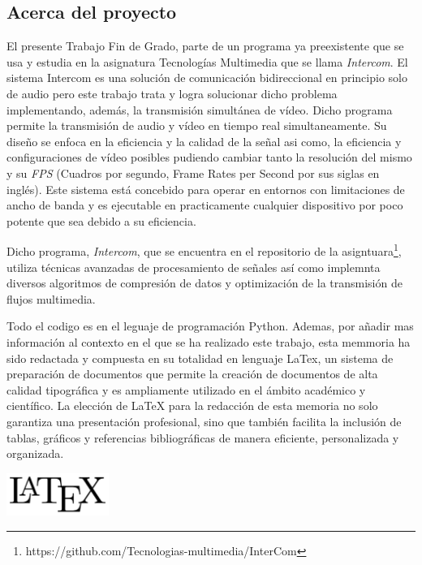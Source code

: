 \label{sec:justificacion_y_objetivos}

\subsection{Acerca del proyecto}

El presente Trabajo Fin de Grado, parte de un programa ya preexistente que se usa y estudia en la asignatura Tecnologías Multimedia que se llama \textit{Intercom}. El sistema Intercom es una solución de comunicación bidireccional en principio solo de audio pero este trabajo trata y logra solucionar dicho problema implementando, además, la transmisión simultánea de vídeo. Dicho programa permite la transmisión de audio y vídeo en tiempo real simultaneamente. Su diseño se enfoca en la eficiencia y la calidad de la señal asi como, la eficiencia y configuraciones de vídeo posibles pudiendo cambiar tanto la resolución del mismo y su \textit{FPS} (Cuadros por segundo, Frame Rates per Second por sus siglas en inglés). Este sistema está concebido para operar en entornos con limitaciones de ancho de banda y es ejecutable en practicamente cualquier dispositivo por poco potente que sea debido a su eficiencia.
\vspace{\baselineskip}

Dicho programa, \textit{Intercom}, que se encuentra en el repositorio de la asigntuara\footnote{https://github.com/Tecnologias-multimedia/InterCom}, utiliza técnicas avanzadas de procesamiento de señales así como implemnta diversos algoritmos de compresión de datos y optimización de la transmisión de flujos multimedia. 

\vspace{\baselineskip}
Todo el codigo es en el leguaje de programación Python. Ademas, por añadir mas información al contexto en el que se ha realizado este trabajo, esta memmoria ha sido redactada y compuesta en su totalidad en lenguaje LaTex, un sistema de preparación de documentos que permite la creación de documentos de alta calidad tipográfica y es ampliamente utilizado en el ámbito académico y científico. La elección de LaTeX para la redacción de esta memoria no solo garantiza una presentación profesional, sino que también facilita la inclusión de tablas, gráficos y referencias bibliográficas de manera eficiente, personalizada y organizada.

\vspace{\baselineskip}
\begin{center}
	\includegraphics[width = 0.25\textwidth]{images/LaTeX_logo.png}
	\label{fig:latex}
\end{center}
\vspace{\baselineskip}

